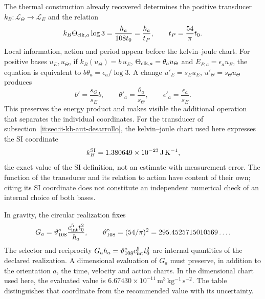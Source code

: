 The thermal construction already recovered determines the positive transducer
\(k_B:\mathcal L_\Theta\to\mathcal L_E\) and the relation
\begin{equation}
 k_B\Theta_{{\rm clk},a}\log3
 =\frac{h_a}{108t_0}=\frac{\hbar_a}{t_P},
 \qquad t_P=\frac{54}{\pi}t_0.
 \label{ii:eq:ii-kb-comparacion}
\end{equation}
Local information, action and period appear before the
kelvin--joule chart. For positive bases \(u_E,u_\Theta\), if
\(k_B(u_\Theta)=b\,u_E\),
\(\Theta_{{\rm clk},a}=\theta_a u_\Theta\) and
\(E_{P,a}=\epsilon_a u_E\), the equation is equivalent to
\(b\theta_a=\epsilon_a/\log3\). A change
\(u'_E=s_Eu_E\), \(u'_\Theta=s_\Theta u_\Theta\) produces
\[
 b'=\frac{s_\Theta}{s_E}b,\qquad
 \theta'_a=\frac{\theta_a}{s_\Theta},\qquad
 \epsilon'_a=\frac{\epsilon_a}{s_E}.
\]
This preserves the energy product and makes visible the additional
operation that separates the individual coordinates. For the transducer
of subsection~\ref{ii:sec:ii-kb-aut-desarrollo}, the kelvin--joule chart
used here expresses the SI coordinate
\[
 k_B^{\rm SI}=1.380649\times10^{-23}\,\mathrm{J\,K^{-1}},
\]
the exact value of the SI definition, not an estimate with measurement error.
The function of the transducer and its relation to action have content
of their own; citing its SI coordinate does not constitute an independent numerical
check of an internal choice of both bases.

In gravity, the circular realization fixes
\begin{equation}
 G_a=\vartheta_{108}^{\circ}\frac{c_{\rm int}^{5}t_0^2}{\hbar_a},
 \qquad
 \vartheta_{108}^{\circ}=(54/\pi)^2
 =295.4525715010569\ldots.
 \label{ii:eq:ii-g-comparacion}
\end{equation}
The selector and reciprocity \(G_a\hbar_a=
\vartheta_{108}^{\circ}c_{\rm int}^{5}t_0^2\) are internal quantities of
the declared realization. A dimensional evaluation of \(G_a\) must
preserve, in addition to the orientation \(a\), the time,
velocity and action charts. In the dimensional chart used here, the evaluated value is
\(6.67430\times10^{-11}\,\mathrm{m^3\,kg^{-1}\,s^{-2}}\).
The table distinguishes that coordinate from the
recommended value with its uncertainty.

